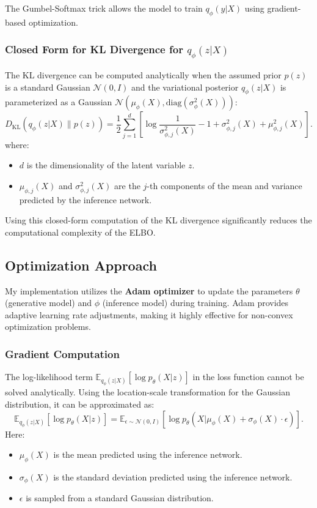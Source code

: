 \documentclass{article}
\begin{document}
The Gumbel-Softmax trick allows the model to train $q_\phi(y|X)$ using gradient-based optimization.

\subsubsection*{Closed Form for KL Divergence for $q_\phi(z|X)$}
The KL divergence can be computed analytically when the assumed prior $p(z)$ is a standard Gaussian $\mathcal{N}(0, I)$ and the variational posterior $q_\phi(z|X)$ is parameterized as a Gaussian $\mathcal{N}(\mu_\phi(X), \text{diag}(\sigma^2_\phi(X)))$:
\[
D_{\text{KL}}(q_\phi(z|X) \| p(z)) = \frac{1}{2} \sum_{j=1}^{d} \left[ \log \frac{1}{\sigma^2_{\phi,j}(X)} - 1 + \sigma^2_{\phi,j}(X) + \mu^2_{\phi,j}(X) \right]. \tag{12}
\]
where:
\begin{itemize}
    \item $d$ is the dimensionality of the latent variable $z$.
    \item $\mu_{\phi,j}(X)$ and $\sigma^2_{\phi,j}(X)$ are the $j$-th components of the mean and variance predicted by the inference network.
\end{itemize}

Using this closed-form computation of the KL divergence significantly reduces the computational complexity of the ELBO.

\subsection*{Optimization Approach}

My implementation utilizes the \textbf{Adam optimizer} to update the parameters $\theta$ (generative model) and $\phi$ (inference model) during training. Adam provides adaptive learning rate adjustments, making it highly effective for non-convex optimization problems.

\subsubsection*{Gradient Computation}

The log-likelihood term $\mathbb{E}_{q_\phi(z|X)}[\log p_\theta(X|z)]$ in the loss function cannot be solved analytically. Using the location-scale transformation for the Gaussian distribution, it can be approximated as:
\[
\mathbb{E}_{q_\phi(z|X)}[\log p_\theta(X|z)] = \mathbb{E}_{\epsilon \sim \mathcal{N}(0, I)}[\log p_\theta(X | \mu_\phi(X) + \sigma_\phi(X) \cdot \epsilon)]. \tag{10}
\]
Here:
\begin{itemize}
    \item $\mu_\phi(X)$ is the mean predicted using the inference network.
    \item $\sigma_\phi(X)$ is the standard deviation predicted using the inference network.
    \item $\epsilon$ is sampled from a standard Gaussian distribution.
\end{itemize}
\end{document}
